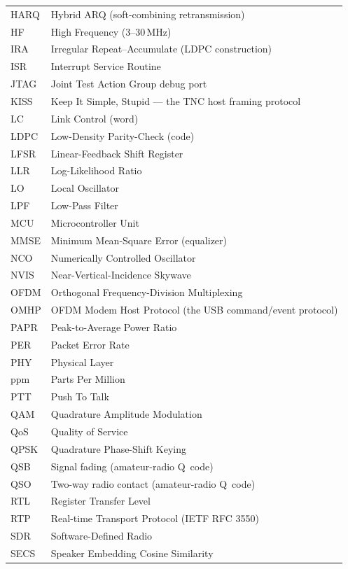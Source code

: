 \begin{longtable}{@{}p{3.0cm}p{11.4cm}@{}}
HARQ   & Hybrid ARQ (soft-combining retransmission) \\
HF     & High Frequency (3--30\,MHz) \\
IRA    & Irregular Repeat--Accumulate (LDPC construction) \\
ISR    & Interrupt Service Routine \\
JTAG   & Joint Test Action Group debug port \\
KISS   & Keep It Simple, Stupid --- the TNC host framing protocol \\
LC     & Link Control (word) \\
LDPC   & Low-Density Parity-Check (code) \\
LFSR   & Linear-Feedback Shift Register \\
LLR    & Log-Likelihood Ratio \\
LO     & Local Oscillator \\
LPF    & Low-Pass Filter \\
MCU    & Microcontroller Unit \\
MMSE   & Minimum Mean-Square Error (equalizer) \\
NCO    & Numerically Controlled Oscillator \\
NVIS   & Near-Vertical-Incidence Skywave \\
OFDM   & Orthogonal Frequency-Division Multiplexing \\
OMHP   & OFDM Modem Host Protocol (the USB command/event protocol) \\
PAPR   & Peak-to-Average Power Ratio \\
PER    & Packet Error Rate \\
PHY    & Physical Layer \\
ppm    & Parts Per Million \\
PTT    & Push To Talk \\
QAM    & Quadrature Amplitude Modulation \\
QoS    & Quality of Service \\
QPSK   & Quadrature Phase-Shift Keying \\
QSB    & Signal fading (amateur-radio Q~code) \\
QSO    & Two-way radio contact (amateur-radio Q~code) \\
RTL    & Register Transfer Level \\
RTP    & Real-time Transport Protocol (IETF RFC 3550) \\
SDR    & Software-Defined Radio \\
SECS   & Speaker Embedding Cosine Similarity \\

\end{longtable}

